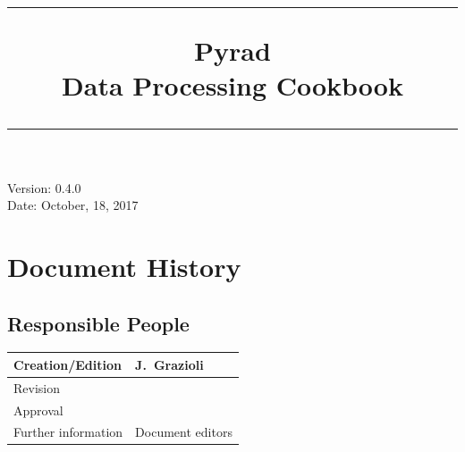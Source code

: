 \documentclass[a4paper,11pt,pdftex,twoside]{scrartcl}
\title{
  \begin{center}
    \vspace{-10mm}
    \rule{0.9\textwidth}{0.5pt}
    \vspace{7mm}
    {\bf \huge Pyrad }\\[10mm]
    {\bf \huge Data Processing Cookbook}\\
    \vspace{-3mm}
    \rule{0.9\textwidth}{0.5pt}
  \end{center}
}
\date{}
\begin{document}
\maketitle
\thispagestyle{empty} %
\vfill
Version: 0.4.0\\
Date: October, 18, 2017
\clearpage


\thispagestyle{empty} %

\section*{Document History}

\subsection*{Responsible People}
\begin{table}[H]
\begin{center}
\begin{tabularx}{\textwidth}{|l|X|}
  \hline
  Creation/Edition        & J.~Grazioli\\ \hline
  Revision                & \\  \hline
  Approval                & \\  \hline
  Further information     & Document editors\\  \hline
\end{tabularx}
\end{center}
\end{table}
\end{document}
